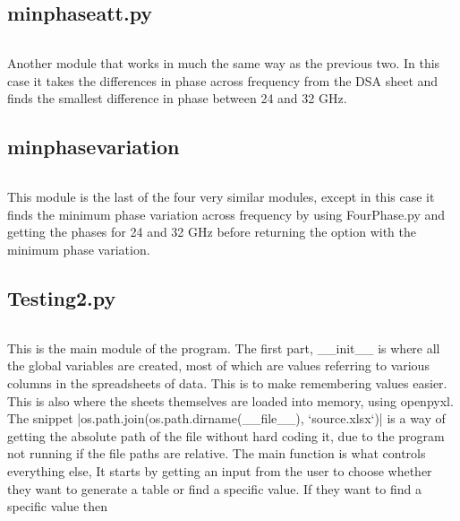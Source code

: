 \documentclass{article}
\begin{document}
\subsection{minphaseatt.py}
\inputminted[linenos, breaklines]{python}{../minphaseatt.py}
Another module that works in much the same way as the previous two. In this case it takes the differences in phase across frequency from the DSA sheet and finds the smallest
difference in phase between 24 and 32 GHz.
\subsection{minphasevariation}
\inputminted[linenos, breaklines]{python}{../minphasevariation.py}
This module is the last of the four very similar modules, except in this case it finds the minimum phase variation across frequency by using FourPhase.py and getting the
phases for 24 and 32 GHz before returning the option with the minimum phase variation.
\subsection{Testing2.py}
\inputminted[linenos, breaklines]{python}{../Testing2.py}
This is the main module of the program. The first part, \_\_init\_\_ is where all the global variables are created, most of which are values referring to various columns in
the spreadsheets of data. This is to make remembering values easier. This is also where the sheets themselves are loaded into memory, using openpyxl. The snippet
|os.path.join(os.path.dirname(__file__), `source.xlsx`)|
is a way of getting the absolute path of the file without hard coding it, due to the program not running if the file paths are relative. The main function is what controls
everything else, It starts by getting an input from the user to choose whether they want to generate a table or find a specific value. If they want to find a specific value
then 
\end{document}
